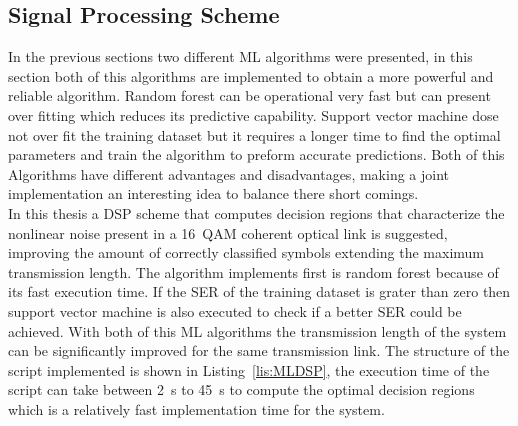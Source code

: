 \subsection{Signal Processing Scheme }
In the previous sections two different ML algorithms were presented, in this section both of this algorithms are implemented to obtain a more powerful and reliable algorithm. Random forest can be operational very fast but can present over fitting which reduces its predictive capability. Support vector machine dose not over fit the training dataset but it requires a longer time to find the optimal parameters and train the algorithm to preform accurate predictions. Both of this Algorithms have different advantages and disadvantages, making a joint implementation an interesting idea to balance there short comings.~\\

In this thesis a DSP scheme that computes decision regions that characterize the nonlinear noise present in a 16~QAM coherent optical link is suggested, improving the amount of correctly classified symbols extending the maximum transmission length. The algorithm implements first is random forest because of its fast execution time. If the SER of the training dataset is grater than zero then support vector machine is also executed to check if a better SER could be achieved. With both of this ML algorithms the transmission length of the system can be significantly improved for the same transmission link. The structure of the script implemented is shown in Listing~\ref{lis:MLDSP}, the execution time of the script can take between 2~s to 45~s to compute the optimal decision regions which is a relatively fast implementation time for the system.~\\								    

